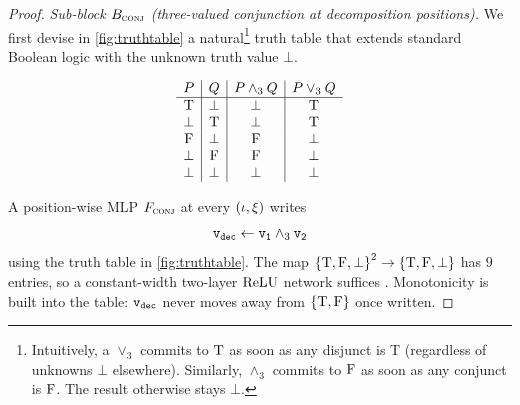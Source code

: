 \documentclass{article}
\begin{document}
\begin{proof}
        \emph{Sub-block $B_{\textsc{conj}}$ (three-valued conjunction at decomposition positions).}
        We first devise in \cref{fig:truthtable} a natural\footnote{Intuitively, a $\lor_3$ commits to ${\mathbin{\mathrm{T}}}$ as soon as any disjunct is T (regardless of unknowns $\bot$ elsewhere).
        Similarly, $\land_3$ commits to ${\mathbin{\mathrm{F}}}$ as soon as any conjunct is ${\mathbin{\mathrm{F}}}$.
        The result otherwise stays $\bot$.} truth table that extends standard Boolean logic with the unknown truth value $\bot$.
        \begin{table}[H]
            \centering
            \[
            \begin{array}{c|c|c|c}
                P & Q & P \land_3 Q & P \lor_3 Q \\
                \hline
                {\mathbin{\mathrm{T}}} & \bot & \bot & {\mathbin{\mathrm{T}}} \\
                \bot & {\mathbin{\mathrm{T}}} & \bot & {\mathbin{\mathrm{T}}} \\
                {\mathbin{\mathrm{F}}} & \bot & {\mathbin{\mathrm{F}}} & \bot \\
                \bot & {\mathbin{\mathrm{F}}} & {\mathbin{\mathrm{F}}} & \bot \\
                \bot & \bot & \bot & \bot \\
            \end{array}
            \]
            \caption{Truth table for a three-valued logic \\ that handles propositions with unknown truth value.}
            \label{fig:truthtable}
        \end{table}
        
        A position-wise MLP $F_{\textsc{conj}}$ at every $({{ \iota}}, {{\xi}})$ writes
        \begin{equation*}
            {\mathtt{v}_\mathtt{dec}} \gets {\mathtt{v}_\mathtt{1}} \wedge_3 {\mathtt{v}_\mathtt{2}}
        \end{equation*}
        using the truth table in \cref{fig:truthtable}. The map ${{\{ {\mathbin{\mathrm{T}}}, {\mathbin{\mathrm{F}}}, \bot \}}}^2 \to {{\{ {\mathbin{\mathrm{T}}}, {\mathbin{\mathrm{F}}}, \bot \}}}$ has $9$ entries, so a constant-width two-layer ${{ \mathrm{ReLU}}}$ network suffices \citep{yang2025transformercookbook}.
        Monotonicity is built into the table: ${\mathtt{v}_\mathtt{dec}}$ never moves away from ${{\{ {\mathbin{\mathrm{T}}}, {\mathbin{\mathrm{F}}} \}}}$ once written.
        

\end{proof}
\end{document}
